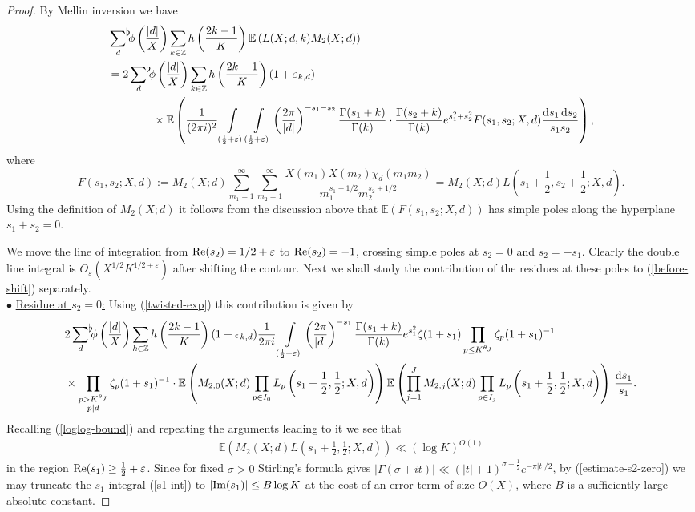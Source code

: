 \documentclass[a4paper,10pt,twoside]{amsart}
\theoremstyle{definition}
\numberwithin{equation}{section}
\newcommand\Z{\mathbb{Z}}
\newcommand\eps{\varepsilon}
\renewcommand{\Re}{\textnormal{Re}}
\renewcommand{\Im}{\textnormal{Im}}
\renewcommand\:{\colon}
\newcommand{\sumflat}{\mathop{{\sum}^{\raisebox{-3pt}{\makebox[0pt][l]{$\flat$}}}}}
\begin{document}
\begin{proof} By Mellin inversion we have
\begin{align}\label{before-shift}
&\sumflat_{d}\phi\left(\frac{|d|}X\right)\sum_{k\in\Z}h\left(\frac{2k-1}K\right)\mathbb E\left(L(X;d,k)M_2(X;d)\right) \nonumber\\
&=2\sumflat_{d}\phi\left(\frac{|d|}X\right)\sum_{k\in\Z}h\left(\frac{2k-1}K\right)(1+\varepsilon_{k,d}) \nonumber\\
&\qquad\qquad\times\mathbb E\left(\frac1{(2\pi i)^2}\int\limits_{(\frac12+\eps)}\int\limits_{(\frac12+\eps)}\left(\frac{2\pi}{|d|}\right)^{-s_1-s_2}\frac{\Gamma(s_1+k)}{\Gamma(k)}\cdot\frac{\Gamma (s_2+k)}{\Gamma(k)}e^{s_1^2+s_2^2}F(s_1,s_2;X,d)\frac{\mathrm d s_1\,\mathrm d s_2}{s_1s_2}\right), 
\end{align}
where 
\[ 
F(s_1,s_2;X,d):=M_2(X;d)\sum_{m_1=1}^\infty\sum_{m_2=1}^\infty\frac{X(m_1)X(m_2)\chi_d(m_1m_2)}{m_1^{s_1+1/2}m_2^{s_2+1/2}}=M_2(X;d)L\left(s_1+\frac12,s_2+\frac12;X,d\right).
\]
Using the definition of $M_2(X;d)$ it follows from the discussion above that $\mathbb E(F(s_1,s_2;X,d))$ has simple poles along the hyperplane $s_1+s_2=0$. 

We move the line of integration from $\Re(s_2)=1/2+\eps$ to $\Re(s_2)=-1$, crossing simple poles at $s_2=0$ and $s_2=-s_1$. Clearly the double line integral is $O_\eps(X^{1/2}K^{1/2+\varepsilon})$ after shifting the contour. Next we shall study the contribution of the residues at these poles to (\ref{before-shift}) separately. \\

\noindent $\bullet$ \underline{Residue at $s_2=0$:} Using (\ref{twisted-exp}) this contribution is given by
\begin{align}\label{s1-int}
&2\sumflat_{d}\phi\left(\frac{|d|}X\right)\sum_{k\in\Z}h\left(\frac{2k-1}K\right)(1+\eps_{k,d})\frac1{2\pi i}\int\limits_{(\frac12+\eps)}\left(\frac{2\pi}{|d|}\right)^{-s_1}\frac{\Gamma(s_1+k)}{\Gamma(k)}e^{s_1^2}\zeta(1+s_1)\prod_{p\leq K^{\theta_J}}\zeta_p(1+s_1)^{-1}\\
&\times\prod_{\substack{p>K^{\theta_J}\\
p|d}}\zeta_p(1+s_1)^{-1}\cdot\mathbb E\left(M_{2,0}(X;d)\prod_{p\in I_0}L_p\left(s_1+\frac12,\frac12;X,d\right)\right)\mathbb E\left(\prod_{j=1}^J M_{2,j}(X;d)\prod_{p\in I_j}L_p\left(s_1+\frac12,\frac12;X,d\right)\right)\,\frac{\mathrm d s_1}{s_1}. \nonumber
\end{align}
Recalling (\ref{loglog-bound}) and repeating the arguments leading to it we see that 
\begin{align}\label{estimate-s2-zero}
\mathbb E\left(M_2(X;d)L\left(s_1+\frac12,\frac12;X,d\right)\right)\ll (\log K)^{O(1)}
\end{align}
in the region $\Re(s_1)\geq\frac12+\eps$. Since for fixed $\sigma>0$ Stirling's formula gives $|\Gamma(\sigma+it)|\ll (|t|+1)^{\sigma-\frac12}e^{-\pi|t|/2}$, by (\ref{estimate-s2-zero}) we may truncate the $s_1$-integral (\ref{s1-int}) to $|\Im(s_1)|\leq B\log K$ at the cost of an error term of size $O(X)$, where $B$ is a sufficiently large absolute constant. 
 

\end{proof}
\end{document}
